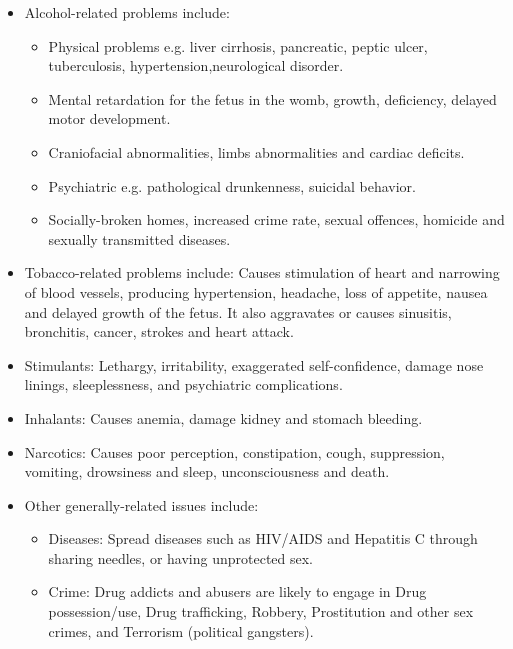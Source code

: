 \documentclass{report}
\begin{document}
\begin{itemize}
    \item Alcohol-related problems include: 
    \begin{itemize}
        \item Physical problems e.g. liver cirrhosis, pancreatic, peptic ulcer, tuberculosis, hypertension,neurological disorder.
        
        \item Mental  retardation   for   the   fetus   in   the   womb,   growth,   deficiency,   delayed motor development.
        
        \item Craniofacial abnormalities, limbs abnormalities and cardiac deficits.
        
        \item Psychiatric e.g. pathological drunkenness, suicidal behavior.
        
        \item Socially-broken homes, increased crime rate, sexual offences, homicide and sexually transmitted diseases.
    \end{itemize}
    
    \item Tobacco-related problems include: Causes stimulation of heart and narrowing of blood  vessels,  producing hypertension, headache, loss of appetite, nausea and delayed growth of the fetus. It also aggravates  or causes sinusitis, bronchitis, cancer, strokes and heart attack.
    \item Stimulants:   Lethargy,   irritability,   exaggerated   self-confidence,   damage   nose linings, sleeplessness, and psychiatric complications.
    
    \item Inhalants: Causes anemia, damage kidney and stomach bleeding.
    
    \item Narcotics:  Causes poor perception, constipation, cough,  suppression, vomiting, drowsiness and sleep, unconsciousness and death.
    
    \item Other generally-related issues include:
    \begin{itemize}
        \item Diseases: Spread diseases such as HIV/AIDS and Hepatitis C through sharing needles, or having unprotected sex.
        
        \item Crime: Drug addicts and abusers are likely to engage in Drug possession/use, Drug trafficking, Robbery, Prostitution and other sex crimes, and Terrorism (political gangsters).
        

\end{itemize}
\end{itemize}
\end{document}
